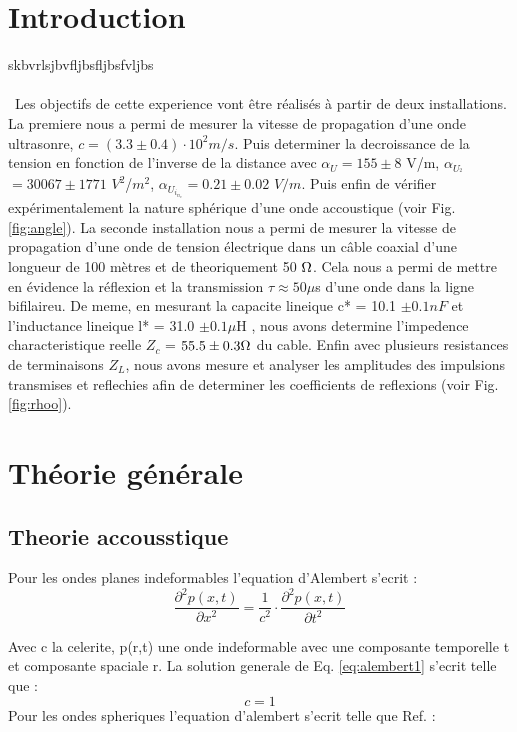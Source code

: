 \section{Introduction}
skbvrlsjbvfljbsfljbsfvljbs\\\\\
Les objectifs de cette experience vont être réalisés à partir de deux installations. La premiere nous a permi de mesurer la vitesse de propagation d'une onde ultrasonre, $c = (3.3 \pm 0.4) \cdot 10^2 m/s$. Puis determiner la decroissance de la tension en fonction de l'inverse de la distance avec $\alpha_U = 155 \pm 8$ V/m, $\alpha_U_^2$ $= 30067 \pm 1771$ $V^2$/$m^2$, $\alpha_U_i_n_v = 0.21 \pm 0.02$ $V/m$. Puis enfin de vérifier expérimentalement la nature sphérique d'une onde accoustique (voir Fig. \ref{fig:angle}). La seconde installation nous a permi de mesurer la vitesse de propagation d'une onde de tension électrique dans un câble coaxial d'une longueur de 100 mètres et de theoriquement 50 $\ohm$. Cela nous a permi de mettre en évidence la réflexion et la transmission $\tau \approx 50 \mu$s d'une onde dans la ligne bifilaireu. De meme, en mesurant la capacite lineique c* = 10.1 $\pm 0.1 nF$ et l'inductance lineique l* = 31.0 $\pm 0.1 \mu$H , nous avons determine l'impedence characteristique reelle $Z_c$ = $55.5 \pm 0.3 \ohm $ du cable. Enfin avec plusieurs resistances de terminaisons $Z_L$, nous avons mesure et analyser les amplitudes des impulsions transmises et reflechies afin de determiner les coefficients de reflexions (voir Fig. \ref{fig:rhoo}). 

\section{Théorie générale}

\subsection{Theorie accousstique}

Pour les ondes planes indeformables l'equation d'Alembert s'ecrit : 
\begin{equation}
	\frac{\partial^2p(x,t)}{\partial x^2} = \frac{1}{c^2} \cdot \frac{\partial^2p(x,t)}{\partial t^2}
	\label{eq:alembert1}
\end{equation}

Avec c la celerite, p(r,t) une onde indeformable avec une composante temporelle t et composante spaciale r. La solution generale de Eq. \ref{eq:alembert1} s'ecrit telle que :
\begin{equation}
	c = 1
	\label{eq:solution_plane}
\end{equation}
Pour les ondes spheriques l'equation d'alembert s'ecrit telle que Ref. \cite{protocole} :

